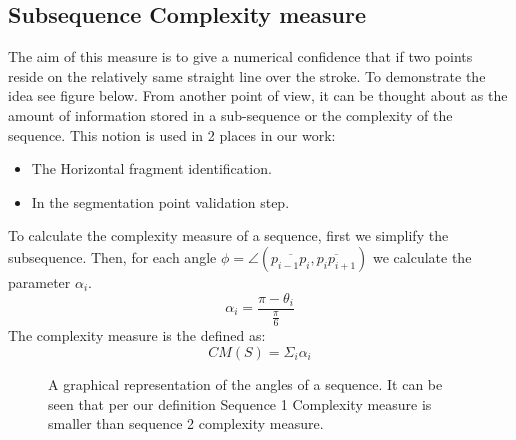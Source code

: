 \documentclass[journal,compsoc]{IEEEtran}
\begin{document}
\subsection{Subsequence Complexity measure }
\label{subsec:scm}
The aim of this measure is to give a numerical confidence that if two points reside on the relatively same straight line over the stroke. To demonstrate the idea see figure below. From another point of view, it can be thought about as the amount of information stored in a sub-sequence or the complexity of the sequence. This notion is used in 2 places in our work:
\begin{itemize}
\item The Horizontal fragment identification.
\item In the segmentation point validation step.
\end{itemize}

To calculate the complexity measure of a sequence, first we simplify the subsequence. Then, for each angle  $\phi=\angle(\overline{p_{i-1}p_{i}},\overline{p_{i}p_{i+1}})$ we calculate the parameter $\alpha_{i}$.
\begin{equation}
 \alpha_{i}=\frac{\pi-\theta_{i}}{\frac{\pi}{6}}
\end{equation}
The complexity measure is the defined as:
\begin{equation}
CM(S)=\Sigma_{i}\alpha_{i}
\end{equation}

\begin{figure}[h]
     \begin{center}
    \end{center}
    \caption{A graphical representation of the angles of a sequence. It can be seen that per our definition Sequence 1 Complexity measure is smaller than sequence 2 complexity measure.}
   \label{fig:sequence_complexity}
\end{figure}
\end{document}

